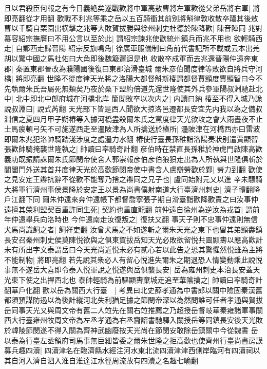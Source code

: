 且以君殺臣何報之有今日義絶矣遂戰歡將中軍高敖曹將左軍歡從父弟岳將右軍|{
	將即亮翻從才用翻}
歡戰不利兆等乘之岳以五百騎衝其前别將斛律敦收散卒躡其後敖曹以千騎自栗園出横擊之兆等大敗賀拔勝與徐州刺史杜德於陳降歡|{
	陳音陣同}
兆對慕容紹宗撫膺曰不用公言以至於此|{
	謂紹宗諫兆使歡統州鎮兵而兆不用也}
欲輕騎西走|{
	自鄴西走歸晉陽}
紹宗反旗鳴角|{
	徐廣車服儀制曰角前代書記所不載或云本出羌胡以驚中國之馬杜佑曰大角即後魏簸邏迴是也}
收散卒成軍而去兆還晉陽仲遠奔東郡|{
	秦置東郡晉改為濮陽國後復曰東郡治滑臺城}
爾朱彦伯聞度律等敗欲自將兵守河橋|{
	將即亮翻}
世隆不從度律天光將之洛陽大都督斛斯椿謂都督賈顯度賈顯智曰今不先執爾朱氏吾屬死無類矣乃夜於桑下盟約倍道先還世隆使其外兵參軍陽叔淵馳赴北中|{
	北中即北中郎府城在河橋北岸}
簡閲敗卒以次内之|{
	内讀曰納}
椿至不得入城乃詭說叔淵曰|{
	說式芮翻}
天光部下皆是西人聞欲大掠洛邑遷都長安宜先内我以為之備叔淵信之夏四月甲子朔椿等入據河橋盡殺爾朱氏之黨度律天光欲攻之會大雨晝夜不止士馬疲頓弓矢不可施遂西走至灅陂津為人所擒送於椿所|{
	灅陂津在河橋西亦曰雷波即爾朱兆犯洛帥騎踏淺涉度之處灅力水翻}
椿使行臺長孫稚詣洛陽奏狀别遣賈顯智張歡帥騎掩襲世隆執之|{
	帥讀曰率騎奇計翻}
彦伯時在禁直長孫稚於神虎門啟陳高歡義功既振請誅爾朱氏節閔帝使舍人郭崇報彦伯彦伯狼狽走出為人所執與世隆俱斬於閶闔門外送其首幷度律天光於高歡節閔帝使中書含人盧辯勞歡於鄴|{
	勞力到翻}
歡使之見安定王辯抗辭不從歡不能奪乃捨之辯同之兄子也|{
	盧同始附元乂以進}
辛未驃騎大將軍行濟州事侯景降於安定王以景為尚書僕射南道大行臺濟州刺史|{
	濟子禮翻降戶江翻下同}
爾朱仲遠來奔仲遠帳下都督喬寧張子期自滑臺詣歡降歡責之曰汝事仲遠擅其榮利盟契百重許同生死|{
	契約也重直龍翻}
前仲遠自徐州為逆汝為戎首|{
	謂前年仲遠舉兵向洛時也}
今仲遠南走汝復叛之|{
	復扶又翻}
事天子則不忠事仲遠則無信犬馬尚識飼之者|{
	飼祥吏翻}
汝曾犬馬之不如遂斬之爾朱天光之東下也留其弟顯夀鎮長安召秦州刺史侯莫陳悦欲與之俱東賀拔岳知天光必敗欲留悦共圖顯夀以應高歡計未有所出字文泰謂岳曰今天光尚近悦未必有貳心若以此告之恐其驚懼然悦雖為主將不能制物|{
	將即亮翻}
若先說其衆必人有留心悦進失爾朱之期退恐人情變動乘此說悦事無不遂岳大喜即令泰入悦軍說之悦遂與岳俱襲長安|{
	岳為雍州刺史本治長安蓋天光東下使之出捍西北也}
泰帥輕騎為前驅顯夀棄城走追至華隂擒之|{
	帥讀曰率騎奇計翻華戶化翻}
歡以岳為關西大行臺　|{
	考異曰北史薛孝通為中書郎以關中險固秦漢舊都須預謀防遏以為後計縱河北失利猶足據之節閔帝深以為然問誰可任者孝通與賀拔岳同事天光又與周文帝有舊二人竝先在關右竝推薦之乃超授岳督岐華秦雍諸軍事關西大行臺雍州牧周文帝為左丞孝通為右丞齎詔書馳驛入關授岳等同鎮長安後天光敗於韓陵節閔遂不得入關為齊神武幽廢按天光尚在節閔安敢除岳鎮關中今從魏書}
岳以泰為行臺左丞領府司馬事無巨細皆委之爾朱世隆之拒高歡也使齊州行臺尚書房謨募兵趣四瀆|{
	四瀆津名在臨濟縣水經注河水東北流四瀆津津西側岸臨河有四瀆祠以其自河入濟自泗入淮自淮達江水徑周流故有四瀆之名趣七喻翻}
